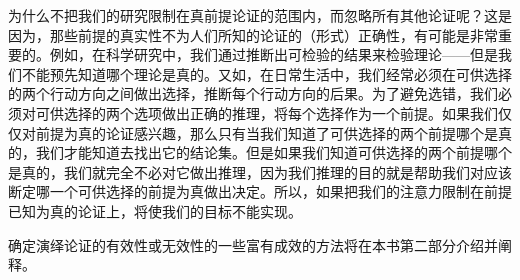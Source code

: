 为什么不把我们的研究限制在真前提论证的范围内，而忽略所有其他论证呢？这是因为，那些前提的真实性不为人们所知的论证的（形式）正确性，有可能是非常重要的。例如，在科学研究中，我们通过推断出可检验的结果来检验理论——但是我们不能预先知道哪个理论是真的。又如，在日常生活中，我们经常必须在可供选择的两个行动方向之间做出选择，推断每个行动方向的后果。为了避免选错，我们必须对可供选择的两个选项做出正确的推理，将每个选择作为一个前提。如果我们仅仅对前提为真的论证感兴趣，那么只有当我们知道了可供选择的两个前提哪个是真的，我们才能知道去找出它的结论集。但是如果我们知道可供选择的两个前提哪个是真的，我们就完全不必对它做出推理，因为我们推理的目的就是帮助我们对应该断定哪一个可供选择的前提为真做出决定。所以，如果把我们的注意力限制在前提已知为真的论证上，将使我们的目标不能实现。

确定演绎论证的有效性或无效性的一些富有成效的方法将在本书第二部分介绍并阐释。


